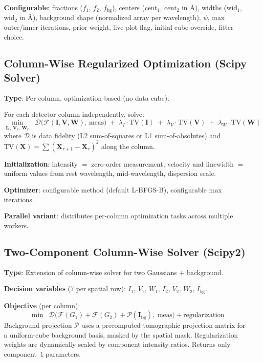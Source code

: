 \documentclass[11pt,a4paper]{article}
\begin{document}
\textbf{Configurable}: fractions ($f_1$, $f_2$, $f_{\text{bg}}$), centers ($\text{cent}_1$, $\text{cent}_2$ in \AA), widths ($\text{wid}_1$, $\text{wid}_2$ in \AA), background shape (normalized array per wavelength), $\psi$, max outer/inner iterations, prior weight, live plot flag, initial cube override, fitter choice.

\subsection{Column-Wise Regularized Optimization (Scipy Solver)}
\textbf{Type}: Per-column, optimization-based (no data cube).

For each detector column independently, solve:
\[
\min_{\mathbf{I}_r,\,\mathbf{V}_r,\,\mathbf{W}_r} \;\; \mathcal{D}\big(\mathcal{F}(\mathbf{I},\mathbf{V},\mathbf{W}),\, \text{meas}\big) \;+\; \lambda_I \cdot \text{TV}(\mathbf{I}) \;+\; \lambda_V \cdot \text{TV}(\mathbf{V}) \;+\; \lambda_W \cdot \text{TV}(\mathbf{W})
\]
where $\mathcal{D}$ is data fidelity (L2 sum-of-squares or L1 sum-of-absolutes) and $\text{TV}(\mathbf{X}) = \sum (\mathbf{X}_{r+1} - \mathbf{X}_r)^2$ along the column.

\textbf{Initialization}: intensity $=$ zero-order measurement; velocity and linewidth $=$ uniform values from rest wavelength, mid-wavelength, dispersion scale.

\textbf{Optimizer}: configurable method (default L-BFGS-B), configurable max iterations.

\textbf{Parallel variant}: distributes per-column optimization tasks across multiple workers.

\subsection{Two-Component Column-Wise Solver (Scipy2)}
\textbf{Type}: Extension of column-wise solver for two Gaussians + background.

\textbf{Decision variables} (7 per spatial row): $I_1$, $V_1$, $W_1$, $I_2$, $V_2$, $W_2$, $I_{\text{bg}}$.

\textbf{Objective} (per column):
\[
\min \;\; \mathcal{D}\big(\mathcal{F}(G_1) + \mathcal{F}(G_2) + \mathcal{P}(\mathbf{I}_{\text{bg}}),\; \text{meas}\big) + \text{regularization}
\]
Background projection $\mathcal{P}$ uses a precomputed tomographic projection matrix for a uniform-cube background basis, masked by the spatial mask. Regularization weights are dynamically scaled by component intensity ratios. Returns only component~1 parameters.
\end{document}
